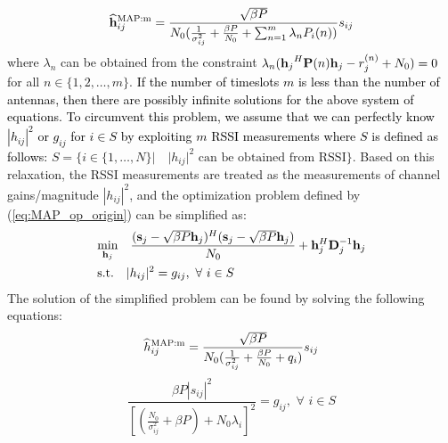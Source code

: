 \documentclass[francais]{gretsi}
\begin{document}
\begin{equation}\label{eq:21}
\widehat{\bold{h}}^{\text{MAP:m}}_{ij}=\frac{\sqrt{\beta P}}{N_0(\frac{1}{\sigma^2_{ij}}+\frac{\beta P}{N_0}+\sum_{n=1}^{m}\lambda_n P_i(n))}{s}_{ij}
\end{equation}
where $\lambda_n$ can be obtained from the constraint $
\lambda_n ({\bold{h}_j}^{H}\bold{P}(n) {\bold{h}_j}-r_{j}^{(n)}+N_0)=0$ for all $n \in \{1,2,\dots,m\}$.
\textcolor{black}{If the number of timeslots $m$ is less than the number of antennas, then there are possibly infinite solutions for the above system of equations. To circumvent this problem,  we assume that we can perfectly know $|h_{ij}|^2$ or $g_{ij}$ for $i \in S$ by exploiting $m$ RSSI measurements where $S$ is defined as follows:} $S=\{i\in\{1,\dots,N\} |\quad |h_{ij}|^2\,\,\text{can be obtained from RSSI} \}$. Based on this relaxation, the RSSI measurements are treated as the measurements of channel gains/magnitude $ |h_{ij}|^2$, and the optimization problem defined by (\ref{eq:MAP_op_origin}) can be simplified as:
\begin{equation}
\begin{split}
&\underset{\bold{h}_j}{\min}\quad \frac{(\bold{s}_j-\sqrt{\beta P}\bold{h}_j)^H(\bold{s}_j-\sqrt{\beta P}\bold{h}_j)}{N_0}+{\bold{h}_j^H\bold{D}_j^{-1}\bold{h}_j}\\
&\mathrm{s.t.} \quad |h_{ij}|^2=g_{ij}, \,\,\forall \,\,i \in S
\end{split}
\end{equation}
The solution of the simplified problem can be found by solving the following equations:
\begin{equation}\label{eq:25}
\widehat{{h}}^{\text{MAP:m}}_{ij}=\frac{\sqrt{\beta P}}{N_0(\frac{1}{\sigma^2_{ij}}+\frac{\beta P}{N_0}+q_i)}{s}_{ij}\\
\end{equation}
\begin{equation}\label{eq:26}
\frac{\beta P |s_{ij}|^2 }{[(\frac{N_0}{\sigma_{ij}^2}+{\beta P})+N_0\lambda_i]^2}=g_{ij} , \,\,\forall \,\,i \in S
\end{equation}
\end{document}
